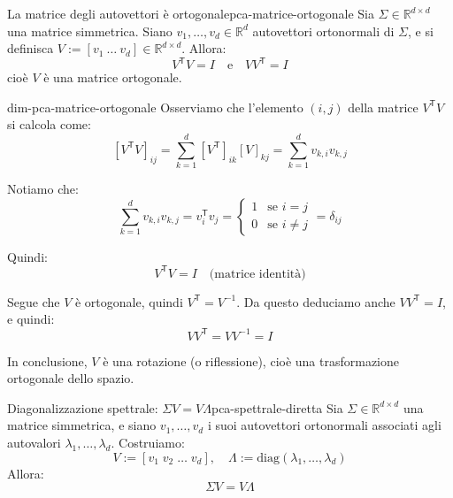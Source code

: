 \begin{proposizione}{La matrice degli autovettori è
ortogonale}{pca-matrice-ortogonale}
Sia \( \Sigma \in \mathbb{R}^{d \times d} \) una matrice simmetrica. Siano \(
v_1, \dots, v_d \in \mathbb{R}^d \) autovettori ortonormali di \( \Sigma \), e
si definisca \( V := [v_1 \ \dots \ v_d] \in \mathbb{R}^{d \times d} \). Allora:
\[
V^\mathsf{T} V = I \quad \text{e} \quad VV^\mathsf{T} = I
\]
cioè \( V \) è una matrice ortogonale.
\end{proposizione}

\begin{dimostrazione}{}{dim-pca-matrice-ortogonale}
Osserviamo che l’elemento \( (i, j) \) della matrice \( V^\mathsf{T} V \) si
calcola come:
\[
[V^\mathsf{T} V]_{ij} = \sum_{k=1}^d [V^\mathsf{T}]_{ik} [V]_{kj}
= \sum_{k=1}^d v_{k,i} v_{k,j}
\]

Notiamo che:
\[
\sum_{k=1}^d v_{k,i} v_{k,j} = v_i^\mathsf{T} v_j =
\begin{cases}
1 & \text{se } i = j \\
0 & \text{se } i \neq j
\end{cases}
= \delta_{ij}
\]

Quindi:
\[
V^\mathsf{T} V = I \quad \text{(matrice identità)}
\]

Segue che \( V \) è ortogonale, quindi \( V^\mathsf{T} = V^{-1} \).
Da questo deduciamo anche \( VV^\mathsf{T} = I \), e quindi:
\[
VV^\mathsf{T} = V V^{-1} = I
\]

In conclusione, \( V \) è una rotazione (o riflessione), cioè una
trasformazione ortogonale dello spazio.
\end{dimostrazione}

\begin{proposizione}{Diagonalizzazione spettrale: \texorpdfstring{\( \Sigma V =
V \Lambda \)}{Sigma V = V Lambda}}{pca-spettrale-diretta}
Sia \( \Sigma \in \mathbb{R}^{d \times d} \) una matrice simmetrica, e siano \(
v_1, \dots, v_d \) i suoi autovettori ortonormali associati agli autovalori \(
\lambda_1, \dots, \lambda_d \). Costruiamo:
\[
V := [v_1 \; v_2 \; \dots \; v_d], \quad \Lambda := \mathrm{diag}(\lambda_1,
\dots, \lambda_d)
\]
Allora:
\[
\Sigma V = V \Lambda
\]
\end{proposizione}

